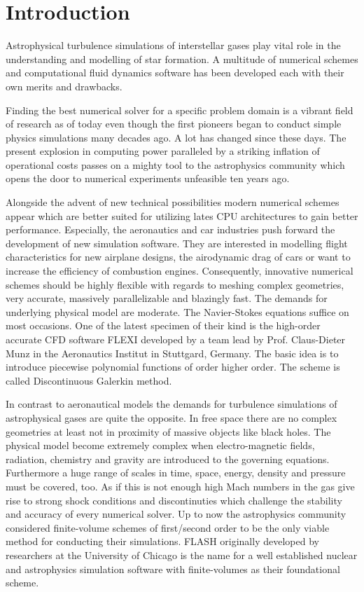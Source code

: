 \section{Introduction}

Astrophysical turbulence simulations of interstellar gases play vital role in
the understanding and modelling of star formation. A multitude of numerical
schemes and computational fluid dynamics software has been developed each
with their own merits and drawbacks.

Finding the best numerical solver for a specific problem domain is a vibrant
field of research as of today even though the first pioneers began to conduct
simple physics simulations many decades ago. A lot has changed since these
days. The present explosion in computing power paralleled by a striking
inflation of operational costs passes on a mighty tool to the astrophysics
community which opens the door to numerical experiments unfeasible ten years
ago.

Alongside the advent of new technical possibilities modern numerical schemes
appear which are better suited for utilizing lates CPU architectures to gain
better performance. Especially, the aeronautics and car industries push forward
the development of new simulation software. They are interested in modelling
flight characteristics for new airplane designs, the airodynamic drag of cars
or want to increase the efficiency of combustion engines. Consequently,
innovative numerical schemes should be highly flexible with regards to meshing
complex geometries, very accurate, massively parallelizable and blazingly fast.
The demands for underlying physical model are moderate. The Navier-Stokes
equations suffice on most occasions. One of the latest specimen of their kind
is the high-order accurate CFD software FLEXI developed by a team lead by
Prof. Claus-Dieter Munz in the Aeronautics Institut in Stuttgard, Germany.
The basic idea is to introduce piecewise polynomial functions of order higher
order. The scheme is called Discontinuous Galerkin method.

In contrast to aeronautical models the demands for turbulence simulations of
astrophysical gases are quite the opposite. In free space there are no complex
geometries at least not in proximity of massive objects like black holes. The
physical model become extremely complex when electro-magnetic fields,
radiation, chemistry and gravity are introduced to the governing equations.
Furthermore a huge range of scales in time, space, energy, density and pressure
must be covered, too. As if this is not enough high Mach numbers in the gas
give rise to strong shock conditions and discontinuties which challenge the
stability and accuracy of every numerical solver. Up to now the astrophysics
community considered finite-volume schemes of first/second order to be the only
viable method for conducting their simulations. FLASH originally developed by
researchers at the University of Chicago is the name for a well established
nuclear and astrophysics simulation software with finite-volumes as their
foundational scheme.

